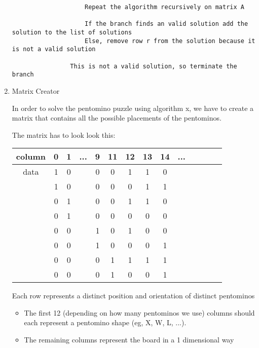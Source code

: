 \documentclass[10pt, a4paper]{article}
\begin{document}
\begin{enumerate}
\begin{mdframed}[backgroundcolor=light-gray, roundcorner=10pt,leftmargin=1, rightmargin=1, innerleftmargin=15, innertopmargin=15,innerbottommargin=15, outerlinewidth=1, linecolor=light-gray]
\begin{lstlisting}
					Repeat the algorithm recursively on matrix A

					If the branch finds an valid solution add the solution to the list of solutions
					Else, remove row r from the solution because it is not a valid solution
				
				This is not a valid solution, so terminate the branch

			\end{lstlisting}
	      \end{mdframed}

	\item Matrix Creator

	      In order to solve the pentomino puzzle using algorithm x, we have to create a matrix that contains all the possible placements of the pentominos.

	      The matrix has to look look this:

	      \begin{tabular}{ c | c  c  c  c   c | c  c  c c c c c c}
		      column & 0 & 1 & ... & 9 & 11 & 12 & 13 & 14 & ... \\
		      \hline
		      data   & 1 & 0 &     & 0 & 0  & 1  & 1  & 0        \\
		             & 1 & 0 &     & 0 & 0  & 0  & 1  & 1        \\
		             & 0 & 1 &     & 0 & 0  & 1  & 1  & 0        \\
		             & 0 & 1 &     & 0 & 0  & 0  & 0  & 0        \\
		             & 0 & 0 &     & 1 & 0  & 1  & 0  & 0        \\
		             & 0 & 0 &     & 1 & 0  & 0  & 0  & 1        \\
		             & 0 & 0 &     & 0 & 1  & 1  & 1  & 1        \\
		             & 0 & 0 &     & 0 & 1  & 0  & 0  & 1        \\
	      \end{tabular}

	      Each row represents a distinct position and orientation of distinct pentominos

	      \begin{itemize}
		      \item The first 12 (depending on how many pentominos we use) columns should each represent a pentomino shape (eg, X, W, L, ...).
		      \item The remaining columns represent the board in a 1 dimensional way


\end{itemize}
\end{enumerate}
\end{document}
